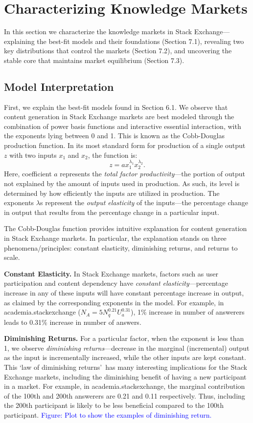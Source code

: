 \section{Characterizing Knowledge Markets}
In this section we characterize the knowledge markets in Stack Exchange---explaining the best-fit models and their foundations (Section 7.1), revealing two key distributions that control the markets (Section 7.2), and uncovering the stable core that maintains market equilibrium (Section 7.3).

\subsection{Model Interpretation} 
First, we explain the best-fit models found in Section 6.1. We observe that content generation in Stack Exchange markets are best modeled through the combination of power basis functions and interactive essential interaction, with the exponents lying between 0 and 1. This is known as the Cobb-Douglas production function. In its most standard form for production of a single output $z$ with two inputs $x_1$ and $x_2$, the function is: 
$$z = ax_1^{\lambda_1}x_2^{\lambda_2}.$$
Here, coefficient $a$ represents the \emph{total factor productivity}---the portion of output not explained by the amount of inputs used in production. As such, its level is determined by how efficiently the inputs are utilized in production. The exponents $\lambda$s represent the \emph{output elasticity} of the inputs---the percentage change in output that results from the percentage change in a particular input. 

The Cobb-Douglas function provides intuitive explanation for content generation in Stack Exchange markets. In particular, the explanation stands on three phenomena/principles: constant elasticity, diminishing returns, and returns to scale.

\textbf{Constant Elasticity.} In Stack Exchange markets, factors such as user participation and content dependency have \emph{constant elasticity}---percentage increase in any of these inputs will have constant percentage increase in output, as claimed by the corresponding exponents in the model. For example, in academia.stackexchange ($N_A = 5N_q^{0.21}U_a^{0.31}$), 1\% increase in number of answerers leads to 0.31\% increase in number of answers. 

\textbf{Diminishing Returns.} For a particular factor, when the exponent is less than 1, we observe \emph{diminishing returns}---decrease in the marginal (incremental) output as the input is incrementally increased, while the other inputs are kept constant. This \lq law of diminishing returns\rq\ has many interesting implications for the Stack Exchange markets, including the diminishing benefit of having a new participant in a market. For example, in academia.stackexchange, the marginal contribution of the 100th and 200th answerers are 0.21 and 0.11 respectively. Thus, including the 200th participant is likely to be less beneficial compared to the 100th participant. \textcolor{blue}{Figure: Plot to show the examples of diminishing return.}

